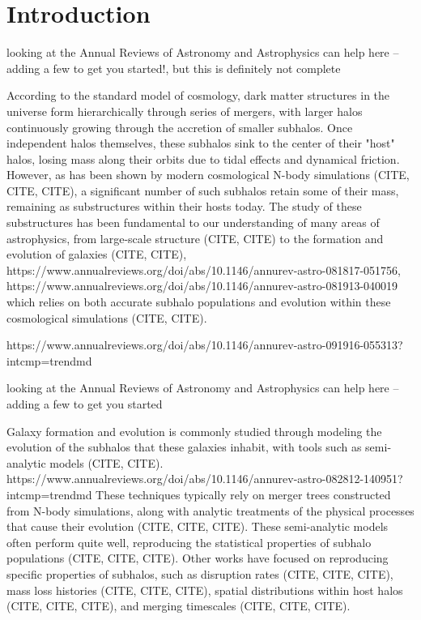 \documentclass[fleqn,usenatbib]{mnras}
\newcommand\khb[1]{{\color{blue}#1}}
\begin{document}
\section{Introduction}

\khb{looking at the Annual Reviews of Astronomy and Astrophysics can help here -- adding a few to get you started!, but this is definitely not complete}

According to the standard \LambdaCDM model of cosmology, dark matter structures in the universe form hierarchically through series of mergers, with larger halos continuously growing through the accretion of smaller subhalos. Once independent halos themselves, these subhalos sink to the center of their "host" halos, losing mass along their orbits due to tidal effects and dynamical friction. However, as has been shown by modern cosmological N-body simulations (CITE, CITE, CITE), a significant number of such subhalos retain some of their mass, remaining as substructures within their hosts today. The study of these substructures has been fundamental to our understanding of many areas of astrophysics, from large-scale structure (CITE, CITE) to the formation and evolution of galaxies (CITE, CITE), 
\khb{https://www.annualreviews.org/doi/abs/10.1146/annurev-astro-081817-051756, https://www.annualreviews.org/doi/abs/10.1146/annurev-astro-081913-040019}
which relies on both accurate subhalo populations and evolution within these cosmological simulations (CITE, CITE).

\khb{https://www.annualreviews.org/doi/abs/10.1146/annurev-astro-091916-055313?intcmp=trendmd}

\khb{looking at the Annual Reviews of Astronomy and Astrophysics can help here -- adding a few to get you started}



Galaxy formation and evolution is commonly studied through modeling the evolution of the subhalos that these galaxies inhabit, with tools such as semi-analytic models (CITE, CITE). 
\khb{https://www.annualreviews.org/doi/abs/10.1146/annurev-astro-082812-140951?intcmp=trendmd}
These techniques typically rely on merger trees constructed from N-body simulations, along with analytic treatments of the physical processes that cause their evolution (CITE, CITE, CITE). These semi-analytic models often perform quite well, reproducing the statistical properties of subhalo populations (CITE, CITE, CITE). Other works have focused on reproducing specific properties of subhalos, such as disruption rates (CITE, CITE, CITE), mass loss histories (CITE, CITE, CITE), spatial distributions within host halos (CITE, CITE, CITE), and merging timescales (CITE, CITE, CITE). 
\end{document}
